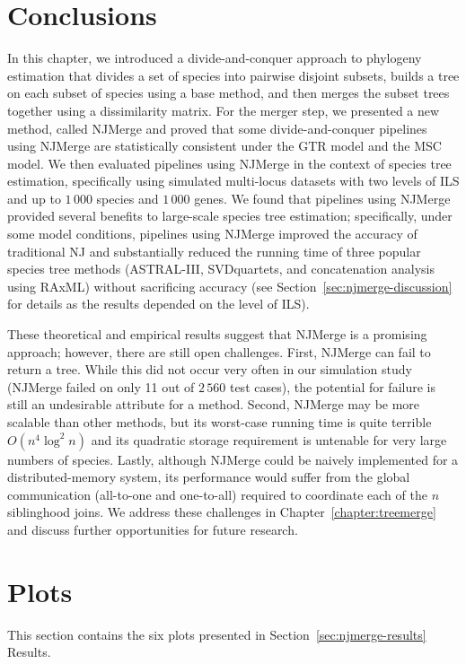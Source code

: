 \section{Conclusions}
In this chapter, we introduced a divide-and-conquer approach to phylogeny estimation that divides a set of species into pairwise disjoint subsets, builds a tree on each subset of species using a base method, and then merges the subset trees together using a dissimilarity matrix.
For the merger step, we presented a new method, called NJMerge and proved that some divide-and-conquer pipelines using NJMerge are statistically consistent under the GTR model and the MSC model.
We then evaluated pipelines using NJMerge in the context of species tree estimation, specifically using simulated multi-locus datasets with two levels of ILS and up to $1\,000$ species and $1\,000$ genes. 
We found that pipelines using NJMerge provided several benefits to large-scale species tree estimation; specifically, under some model conditions, pipelines using NJMerge improved the accuracy of traditional NJ and substantially reduced the running time of three popular species tree methods (ASTRAL-III, SVDquartets, and concatenation analysis using RAxML) without sacrificing accuracy (see Section~\ref{sec:njmerge-discussion} for details as the results depended on the level of ILS).

These theoretical and empirical results suggest that NJMerge is a promising approach; however, there are still open challenges.
First, NJMerge can fail to return a tree.
While this did not occur very often in our simulation study (NJMerge failed on only 11 out of $2\,560$ test cases), the potential for failure is still an undesirable attribute for a method.
Second, NJMerge may be more scalable than other methods, but its worst-case running time is quite terrible $O(n^4 \log^2{n})$ and its quadratic storage requirement is untenable for very large numbers of species.
Lastly, although NJMerge could be naively implemented for a distributed-memory system, its performance would suffer from the global communication (all-to-one and one-to-all) required to coordinate each of the $n$ siblinghood joins.
We address these challenges in Chapter~\ref{chapter:treemerge} and discuss further opportunities for future research.

\afterpage{\clearpage}
\newpage

\section{Plots}
\label{sec:njmerge-plots}
This section contains the six plots presented in Section~\ref{sec:njmerge-results} Results.


